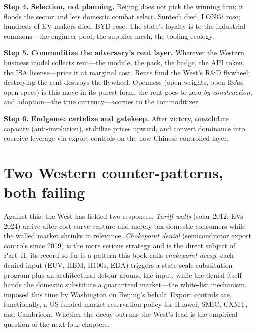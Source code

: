 \textbf{Step 4. Selection, not planning.} Beijing does not pick the winning firm; it floods the sector and lets domestic combat select. Suntech died, LONGi rose; hundreds of EV makers died, BYD rose. The state's loyalty is to the industrial commons---the engineer pool, the supplier mesh, the tooling ecology.

\textbf{Step 5. Commoditize the adversary's rent layer.} Wherever the Western business model collects rent---the module, the pack, the badge, the API token, the ISA license---price it at marginal cost. Rents fund the West's R\&D flywheel; destroying the rent destroys the flywheel. Openness (open weights, open ISAs, open specs) is this move in its purest form: the rent goes to zero \emph{by construction}, and adoption---the true currency---accrues to the commoditizer.

\textbf{Step 6. Endgame: cartelize and gatekeep.} After victory, consolidate capacity (anti-involution), stabilize prices upward, and convert dominance into coercive leverage via export controls on the now-Chinese-controlled layer.

\section{Two Western counter-patterns, both failing}

Against this, the West has fielded two responses. \emph{Tariff walls} (solar 2012, EVs 2024) arrive after cost-curve capture and merely tax domestic consumers while the walled market shrinks in relevance. \emph{Chokepoint denial} (semiconductor export controls since 2019) is the more serious strategy and is the direct subject of Part~II; its record so far is a pattern this book calls \emph{chokepoint decay}: each denied input (EUV, HBM, H100s, EDA) triggers a state-scale substitution program plus an architectural detour around the input, while the denial itself hands the domestic substitute a guaranteed market---the white-list mechanism, imposed this time by Washington on Beijing's behalf. Export controls are, functionally, a US-funded market-reservation policy for Huawei, SMIC, CXMT, and Cambricon. Whether the decay outruns the West's lead is the empirical question of the next four chapters.
